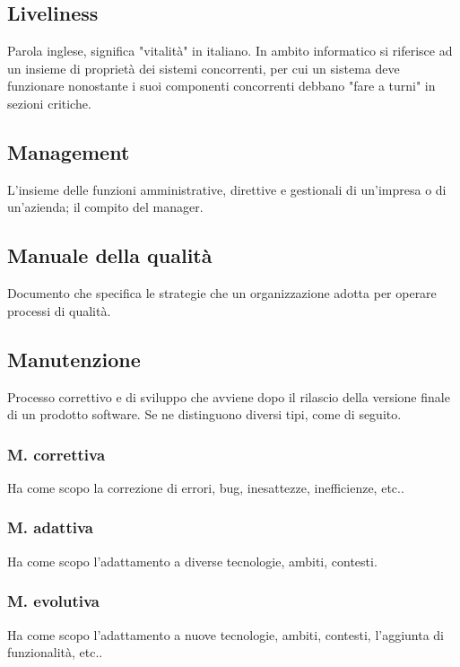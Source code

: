 	
	\subsection{Liveliness}
	\label{sec:liveliness}
	Parola inglese, significa "vitalità" in italiano. In ambito informatico si riferisce ad un insieme di proprietà dei sistemi concorrenti, per cui un sistema deve funzionare nonostante i suoi componenti concorrenti debbano "fare a turni" in sezioni critiche.


	\newpage

	
	\subsection{Management}
	\label{sec:management}
	L'insieme delle funzioni amministrative, direttive e gestionali di un'impresa o di un'azienda; il compito del manager.

	
	\subsection{Manuale della qualità}
	\label{sec:manualequalita}
	Documento che specifica le strategie che un organizzazione adotta per operare processi di qualità.


	\subsection{Manutenzione}
	\label{sec:manutenzione}
	Processo correttivo e di sviluppo che avviene dopo il rilascio della versione finale di un prodotto software. Se ne distinguono diversi tipi, come di seguito.

		
		\subsubsection{M. correttiva}
		Ha come scopo la correzione di errori, bug, inesattezze, inefficienze, etc..

		
		\subsubsection{M. adattiva}
		Ha come scopo l'adattamento a diverse tecnologie, ambiti, contesti.

		
		\subsubsection{M. evolutiva}
		Ha come scopo l'adattamento a nuove tecnologie, ambiti, contesti, l'aggiunta di funzionalità, etc..


